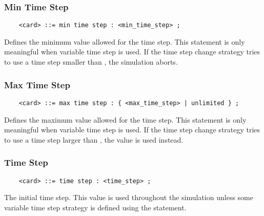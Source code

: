 \subsubsection{Min Time Step}
\begin{verbatim}
    <card> ::= min time step : <min_time_step> ;
\end{verbatim}
Defines the minimum value allowed for the time step.
This statement is only meaningful when variable time step is used.
If the time step change strategy tries to use a time step smaller
than , the simulation aborts.

\subsubsection{Max Time Step}
\begin{verbatim}
    <card> ::= max time step : { <max_time_step> | unlimited } ;
\end{verbatim}
Defines the maximum value allowed for the time step.
This statement is only meaningful when variable time step is used.
If the time step change strategy tries to use a time step larger
than , the value  is used instead.

\subsubsection{Time Step}
\begin{verbatim}
    <card> ::= time step : <time_step> ;
\end{verbatim}
The initial time step.
This value is used throughout the simulation unless some variable time step
strategy is defined using the  statement.

